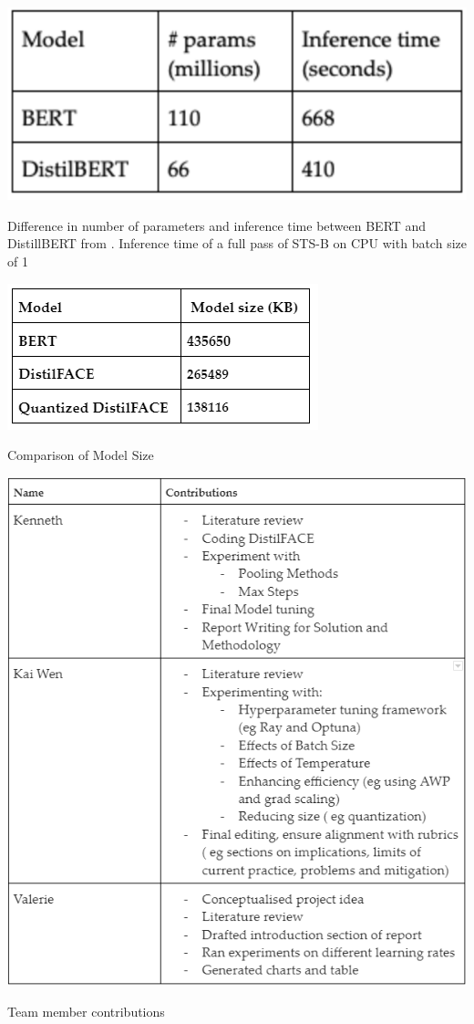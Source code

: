 \documentclass[10pt,twocolumn,letterpaper]{article}
\begin{document}
\begin{appendices}
\begin{table}[hbt!]
\centering
\includegraphics[scale=0.57]{images/Bert-distilbert-comparison.png}
\caption{Difference in number of parameters and inference time between BERT and DistillBERT from \cite{1910.01108}. Inference time of a full pass of STS-B on CPU with batch size of 1}
\label{fig:short}
\end{table}

\begin{table}[hbt!]
\centering
\includegraphics[scale=0.65]{images/Bert-distilFACE-size-comparison.png}
\caption{Comparison of Model Size}
\label{fig:short}
\end{table}

\begin{table}[hbt!]
\includegraphics[scale=0.5]{images/Contributions.png}
\caption{Team member contributions}
\label{fig:short}
\end{table}

\end{appendices}
\end{document}
